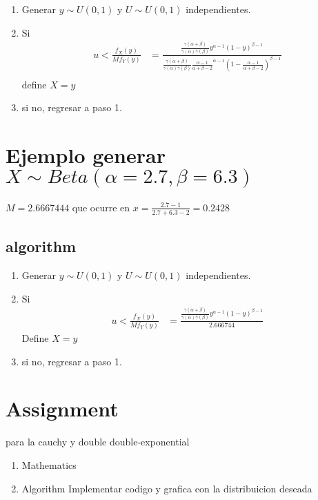 \documentclass[10pt, oneside]{article}
\begin{document}
\begin{enumerate}
	\item Generar $y \sim U(0,1)$ y $U \sim U(0,1)$ independientes.
	\item Si
	      \[
		      \begin{split}
			      u < \frac{f_X(y)}{M f_Y(y)} & = \frac{\frac{\gamma(\alpha + \beta)}{\gamma(\alpha)\gamma(\beta)}y^{\alpha - 1}(1-y)^{\beta-1}}
			      {\frac{\gamma(\alpha + \beta)}{\gamma(\alpha)\gamma(\beta)} \frac{\alpha - 1}{\alpha + \beta - 2}^{\alpha - 1}(1-\frac{\alpha - 1}{\alpha + \beta - 2})^{\beta-1}} \\
		      \end{split}
	      \]
	      define $X=y$
	\item si no, regresar a paso 1.
\end{enumerate}

\section{Ejemplo generar $X \sim Beta( \alpha=2.7, \beta=6.3)$}

$M= 2.6667444$  que ocurre en $x = \frac{2.7 - 1}{2.7 + 6.3 - 2} = 0.2428$

\subsection{algorithm}

\begin{enumerate}
	\item Generar $y \sim U(0,1)$ y $U \sim U(0,1)$ independientes.
	\item Si
	      \[
		      \begin{split}
			      u < \frac{f_X(y)}{M f_Y(y)} & = \frac{\frac{\gamma(\alpha + \beta)}{\gamma(\alpha)\gamma(\beta)}y^{\alpha - 1}(1-y)^{\beta-1}}
			      {2.666744}
		      \end{split}
	      \]
	      Define $X=y$
	\item si no, regresar a paso 1.
\end{enumerate}

\section{Assignment}

para la cauchy y double double-exponential

\begin{enumerate}
	\item Mathematics
	\item Algorithm
	      Implementar codigo y grafica con la distribuicion deseada
\end{enumerate}
\end{document}
